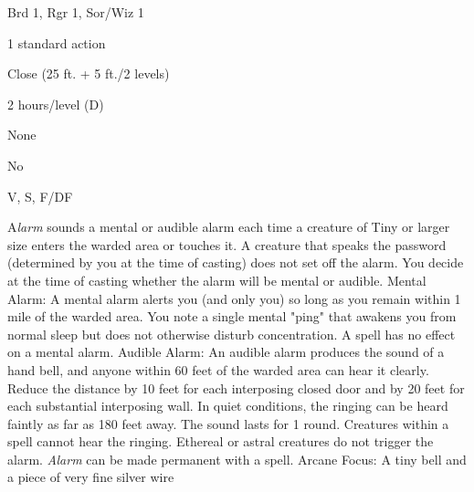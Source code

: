 
\begin{description*}
\item[Level:] Brd 1, Rgr 1, Sor/Wiz 1
\item[Casting Time:] 1 standard action
\item[Range:] Close (25 ft. + 5 ft./2 levels)
\item[Duration:] 2 hours/level (D)
\item[Saving Throw:] None
\item[Spell Resistance:] No
\item[Components:] V, S, F/DF
\end{description*}

A\textit{larm} sounds a mental or audible alarm each time a creature of Tiny or
larger size enters the warded area or touches it. A creature that speaks the password
(determined by you at the time of casting) does not set off the alarm.
You decide at the time of casting whether the alarm will be mental or
audible.
Mental Alarm: A mental alarm alerts you (and only you) so long
as you remain within 1 mile of the warded area. You note a single mental "ping"
that awakens you from normal sleep but does not otherwise disturb concentration.
A  spell has no effect on a mental alarm.
Audible Alarm: An audible alarm produces the sound of a hand
bell, and anyone within 60 feet of the warded area can hear it clearly. Reduce
the distance by 10 feet for each interposing closed door and by 20 feet for each
substantial interposing wall.
In quiet conditions, the ringing can be heard faintly as far as 180 feet away.
The sound lasts for 1 round. Creatures within a  spell cannot hear
the ringing.
Ethereal or astral creatures do not trigger the alarm.
\textit{Alarm} can be made permanent with a  spell.
Arcane Focus: A tiny bell and a piece of very fine silver wire